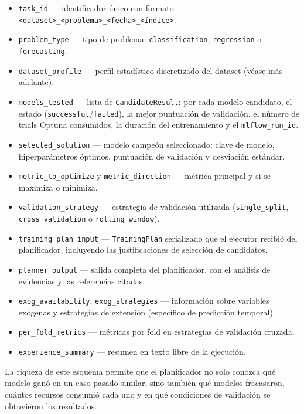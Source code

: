 \begin{itemize}
  \item \texttt{task\_id} — identificador único con formato \texttt{<dataset>\_<problema>\_<fecha>\_<índice>}.
  \item \texttt{problem\_type} — tipo de problema: \texttt{classification}, \texttt{regression} o \texttt{forecasting}.
  \item \texttt{dataset\_profile} — perfil estadístico discretizado del dataset (véase más adelante).
  \item \texttt{models\_tested} — lista de \texttt{CandidateResult}: por cada modelo candidato, el estado (\texttt{successful}/\texttt{failed}), la mejor puntuación de validación, el número de trials Optuna consumidos, la duración del entrenamiento y el \texttt{mlflow\_run\_id}.
  \item \texttt{selected\_solution} — modelo campeón seleccionado: clave de modelo, hiperparámetros óptimos, puntuación de validación y desviación estándar.
  \item \texttt{metric\_to\_optimize} y \texttt{metric\_direction} — métrica principal y si se maximiza o minimiza.
  \item \texttt{validation\_strategy} — estrategia de validación utilizada (\texttt{single\_split}, \texttt{cross\_validation} o \texttt{rolling\_window}).
  \item \texttt{training\_plan\_input} — \texttt{TrainingPlan} serializado que el ejecutor recibió del planificador, incluyendo las justificaciones de selección de candidatos.
  \item \texttt{planner\_output} — salida completa del planificador, con el análisis de evidencias y las referencias citadas.
  \item \texttt{exog\_availability}, \texttt{exog\_strategies} — información sobre variables exógenas y estrategias de extensión (específico de predicción temporal).
  \item \texttt{per\_fold\_metrics} — métricas por fold en estrategias de validación cruzada.
  \item \texttt{experience\_summary} — resumen en texto libre de la ejecución.
\end{itemize}

La riqueza de este esquema permite que el planificador no solo conozca qué modelo ganó en un caso pasado similar, sino también qué modelos fracasaron, cuántos recursos consumió cada uno y en qué condiciones de validación se obtuvieron los resultados.

